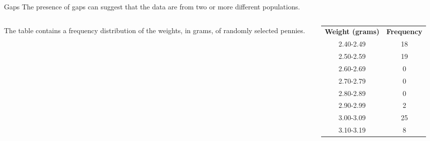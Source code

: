 \documentclass{beamer}
\begin{document}
\begin{frame}
\begin{block}{Gaps}
The presence of gaps can suggest that the data are from two or more different populations.
\end{block}\pause

\begin{example}
\begin{columns}
\begin{column}{0.5\textwidth}
The table contains a frequency distribution of the weights, in grams, of randomly selected pennies.

\vspace{1mm}

\vspace{1mm}
\end{column}
\begin{column}{0.5\textwidth}  %
\begin{center}
\begin{tabular}{cc}
\textbf{Weight (grams)} & \textbf{Frequency} \\
2.40-2.49 & 18 \\
2.50-2.59 & 19 \\
2.60-2.69 & 0 \\
2.70-2.79 & 0 \\
2.80-2.89 & 0 \\
2.90-2.99 & 2 \\
3.00-3.09 & 25 \\
3.10-3.19 & 8
\end{tabular}
\end{center}
\end{column}
\end{columns}
\end{example}
\end{frame}
\end{document}
